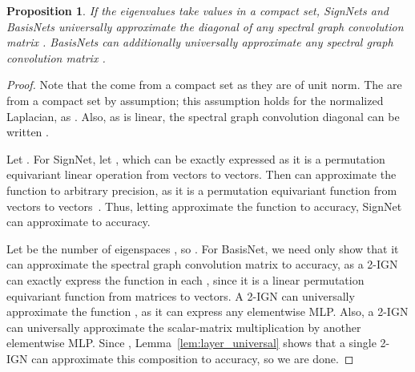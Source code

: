 \documentclass{article} \usepackage{iclr2023_conference,times}
\newtheorem{proposition}{Proposition}
\begin{document}
\begin{proposition}\label{prop:diag_spectral_conv}
    If the eigenvalues take values in a compact set, SignNets and BasisNets universally approximate the diagonal of any spectral graph convolution matrix . BasisNets can additionally universally approximate any spectral graph convolution matrix .
\end{proposition}
\begin{proof}
 Note that the  come from a compact set as they are of unit norm. The  are from a compact set by assumption; this assumption holds for the normalized Laplacian, as . Also, as  is linear, the spectral graph convolution diagonal can be written .

    Let . For SignNet, let , which can be exactly expressed as it is a permutation equivariant linear operation from vectors to vectors. Then  can approximate the function  to arbitrary precision, as it is a permutation equivariant function from vectors to vectors~\citep{segol2019universal}. Thus, letting  approximate the function to  accuracy, SignNet can approximate  to  accuracy.

    Let  be the number of eigenspaces , so . For BasisNet, we need only show that it can approximate the spectral graph convolution matrix to  accuracy, as a 2-IGN can exactly express the  function in each , since it is a linear permutation equivariant function from matrices to vectors. A 2-IGN can universally approximate the function , as it can express any elementwise MLP. Also, a 2-IGN can universally approximate the scalar-matrix multiplication  by another elementwise MLP. Since , Lemma~\ref{lem:layer_universal} shows that a single 2-IGN can approximate this composition to  accuracy, so we are done.

\end{proof}
\end{document}
